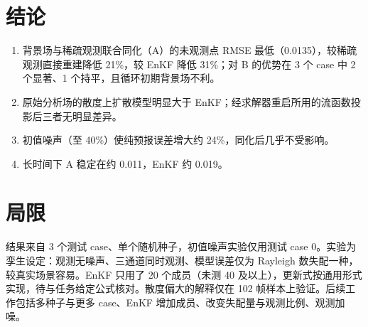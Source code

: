 \documentclass[10.5pt,a4paper]{article}
\begin{document}
\section{结论}
\begin{enumerate}
\item 背景场与稀疏观测联合同化（A）的未观测点 RMSE 最低（0.0135），较稀疏观测直接重建降低 21\%，较 EnKF 降低 31\%；对 B 的优势在 3 个 case 中 2 个显著、1 个持平，且循环初期背景场不利。
\item 原始分析场的散度上扩散模型明显大于 EnKF；经求解器重启所用的流函数投影后三者无明显差异。
\item 初值噪声（至 40\%）使纯预报误差增大约 24\%，同化后几乎不受影响。
\item 长时间下 A 稳定在约 0.011，EnKF 约 0.019。
\end{enumerate}

\section{局限}
结果来自 3 个测试 case、单个随机种子，初值噪声实验仅用测试 case 0。实验为孪生设定：观测无噪声、三通道同时观测、模型误差仅为 Rayleigh 数失配一种，较真实场景容易。EnKF 只用了 20 个成员（未测 40 及以上），更新式按通用形式实现，待与任务给定公式核对。散度偏大的解释仅在 102 帧样本上验证。后续工作包括多种子与更多 case、EnKF 增加成员、改变失配量与观测比例、观测加噪。
\end{document}

